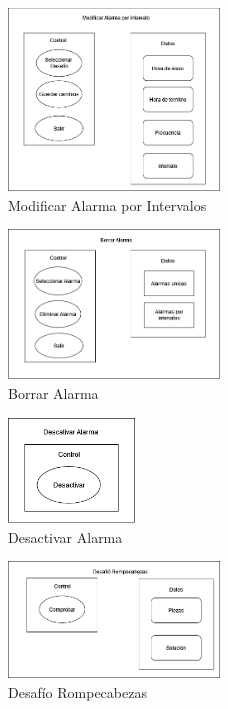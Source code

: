 \begin{figure}[H]
	\centering
	\includegraphics[width=0.5\textwidth]{./img/componentes/05-ModificarAlarmaIntervalos.png}
	\caption{Modificar Alarma por Intervalos}
        \vspace{5pt}
	\label{fig:Modificar Alarma por Intervalos}
\end{figure}

\begin{figure}[H]
	\centering
	\includegraphics[width=0.5\textwidth]{./img/componentes/06-BorrarAlarma.png}
	\caption{Borrar Alarma}
        \vspace{5pt}
	\label{fig:Borrar Alarma}
\end{figure}

\begin{figure}[H]
	\centering
	\includegraphics[width=0.3\textwidth]{./img/componentes/07-DesactivarAlarma.png}
	\caption{Desactivar Alarma}
        \vspace{5pt}
	\label{fig:Desactivar Alarma}
\end{figure}

\begin{figure}[H]
	\centering
	\includegraphics[width=0.5\textwidth]{./img/componentes/08-DesafioRompecabezas.png}
	\caption{Desafío Rompecabezas}
        \vspace{5pt}
	\label{fig:Desafío Rompecabezas}
\end{figure}

